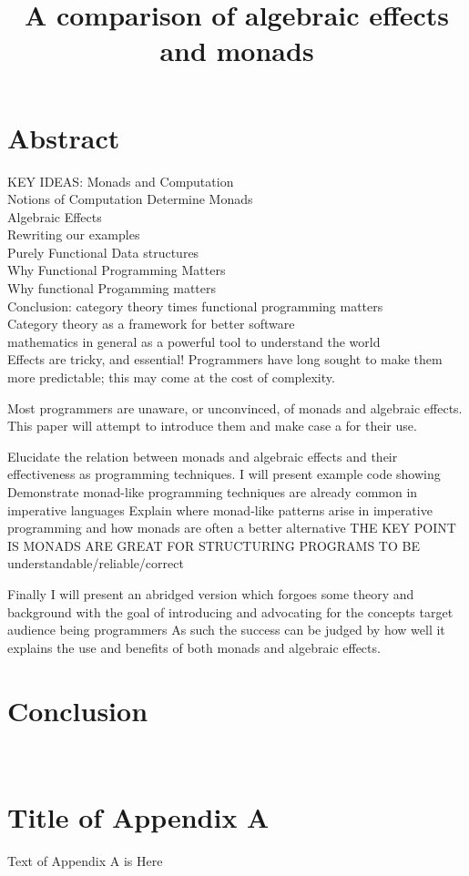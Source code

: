 \documentclass[a4paper,10pt]{article}
\title{A comparison of algebraic effects and monads}
\theoremstyle{definition}
\begin{document}
\section{Abstract}

KEY IDEAS:
Monads and Computation\\
Notions of Computation Determine Monads\\
Algebraic Effects\\
Rewriting our examples\\
Purely Functional Data structures\\
Why Functional Programming Matters\\
Why functional Progamming matters\\
Conclusion: category theory times functional programming matters\\
Category theory as a framework for better software\\
mathematics in general as a powerful tool to understand the world\\


Effects are tricky, and essential!
Programmers have long sought to make them more predictable;
this may come at the cost of complexity.

Most programmers are unaware, or unconvinced, of monads and algebraic effects.
This paper will attempt to introduce them and make case a for their use.

Elucidate the relation between monads and algebraic effects
and their effectiveness as programming techniques.
I will present example code showing
Demonstrate monad-like programming techniques are already common in imperative languages
Explain where monad-like patterns arise in imperative programming and how monads are often a better alternative
THE KEY POINT IS MONADS ARE GREAT FOR STRUCTURING PROGRAMS TO BE understandable/reliable/correct

Finally I will present an abridged version which forgoes some theory and background
with the goal of introducing and advocating for the concepts
target audience being programmers
As such the success can be judged by how well it explains the use and benefits of both monads and algebraic effects.

\pagebreak
\tableofcontents
\pagebreak


\pagebreak


\pagebreak


\pagebreak


\pagebreak


\pagebreak
\section{Conclusion}

\pagebreak
\appendix
\section{\\Title of Appendix A}

Text of Appendix A is Here

\pagebreak


\end{document}
